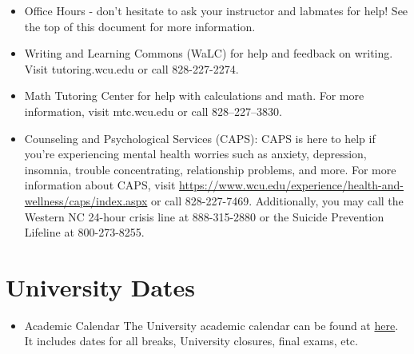 \documentclass[11pt]{article}
\begin{document}
\begin{itemize}
\item Office Hours - don’t hesitate to ask your instructor and labmates for help! See the top of this document for more information.
\item Writing and Learning Commons (WaLC) for help and feedback on writing. Visit tutoring.wcu.edu or call 828-227-2274.
\item Math Tutoring Center for help with calculations and math. For more information, visit mtc.wcu.edu or call 828–227–3830.
\item Counseling and Psychological Services (CAPS): CAPS is here to help if you’re experiencing mental health worries such as anxiety, depression, insomnia, trouble concentrating, relationship problems, and more. For more information about CAPS, visit \url{https://www.wcu.edu/experience/health-and-wellness/caps/index.aspx} or call 828-227-7469. Additionally, you may call the Western NC 24-hour crisis line at 888-315-2880 or the Suicide Prevention Lifeline at 800-273-8255.
\end{itemize}

\section{University Dates}
\label{sec:org94f6007}

\begin{itemize}
\item Academic Calendar The University academic calendar can be found at \href{http://www.wcu.edu/learn/academic-calendar.aspx}{here}. It includes dates for all breaks, University closures, final exams, etc.
\end{itemize}
\end{document}
